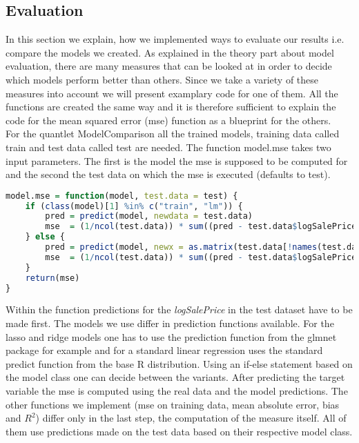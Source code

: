 \subsection{Evaluation}
In this section we explain, how we implemented ways to evaluate our results i.e. compare the models we created. As explained in the theory part about model evaluation, there are many measures that can be looked at in order to decide which models perform better than others. Since we take a variety of these measures into account we will present examplary code for one of them. All the functions are created the same way and it is therefore sufficient to explain the code for the mean squared error (mse) function as a blueprint for the others. \\
For the quantlet ModelComparison all the trained models, training data called train and test data called test are needed. The function model.mse takes two input parameters. The first is the model the mse is supposed to be computed for and the second the test data on which the mse is executed (defaults to test). 
\begin{lstlisting}[language=R]
model.mse = function(model, test.data = test) {
    if (class(model)[1] %in% c("train", "lm")) {
        pred = predict(model, newdata = test.data)
        mse  = (1/ncol(test.data)) * sum((pred - test.data$logSalePrice)^2)
    } else {
        pred = predict(model, newx = as.matrix(test.data[!names(test.data) %in% "logSalePrice"]), s = "lambda.1se")
        mse  = (1/ncol(test.data)) * sum((pred - test.data$logSalePrice)^2)
    }
    return(mse)
}
\end{lstlisting}
Within the function predictions for the \textit{logSalePrice} in the test dataset have to be made first. The models we use differ in prediction functions available. For the lasso and ridge models one has to use the prediction function from the glmnet package for example and for a standard linear regression uses the standard predict  function from the base R distribution. Using an if-else statement based on the model class one can decide between the variants. After predicting the target variable the mse is computed using the real data and the model predictions. The other functions we implement (mse on training data, mean absolute error, bias and $R^2$) differ only in the last step, the computation of the measure itself. All of them use predictions made on the test data based on their respective model class.  